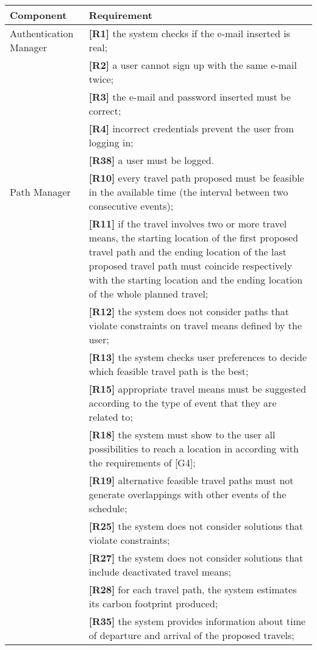 \begin{center}
	\begin{longtable}{ | p{} | p{} | }
		\hline
		\textbf{Component} & \textbf{Requirement}\\
		\hline
		Authentication Manager & \textbf{[R1]} the system checks if the e-mail inserted is real;\\
		& \textbf{[R2]} a user cannot sign up with the same e-mail twice;\\
		& \textbf{[R3]} the e-mail and password inserted must be correct;\\
		& \textbf{[R4]} incorrect credentials prevent the user from logging in;\\
		& \textbf{[R38]} a user must be logged.\\
		\hline
		Path Manager & \textbf{[R10]} every travel path proposed must be feasible in the available time (the interval between two consecutive events);\\
		& \textbf{[R11]} if the travel involves two or more travel means, the starting location of the first proposed travel path and the ending location of the last proposed travel path must coincide respectively with the starting location and the ending location of the whole planned travel;\\
		& \textbf{[R12]} the system does not consider paths that violate constraints on travel means defined by the user;\\
		& \textbf{[R13]} the system checks user preferences to decide which feasible travel path is the best;\\
		& \textbf{[R15]} appropriate travel means must be suggested according to the type of event that they are related to; \\
		& \textbf{[R18]} the system must show to the user all possibilities to reach a location in according with the requirements of [G4];\\
		& \textbf{[R19]} alternative feasible travel paths must not generate overlappings with other events of the schedule;\\
		& \textbf{[R25]} the system does not consider solutions that violate constraints;\\
		& \textbf{[R27]} the system does not consider solutions that include deactivated travel means;\\
		& \textbf{[R28]} for each travel path, the system estimates its carbon footprint produced;\\
		& \textbf{[R35]} the system provides information about time of departure and arrival of the proposed travels;\\

\end{longtable}
\end{center}

